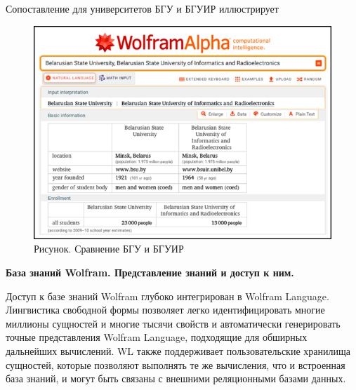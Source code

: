 Сопоставление для университетов БГУ и БГУИР иллюстрирует  \textit{}
\begin{figure}[H]
	\includegraphics[scale=0.86]{images/part7/chapter_integration/integr_alg3.png}
	\caption{Рисунок. Сравнение БГУ и БГУИР}
	\label{fig:integr_alg3}
\end{figure}

\textbf{База знаний Wolfram. Представление знаний и доступ к ним.}

Доступ к базе знаний Wolfram глубоко интегрирован в Wolfram Language. Лингвистика свободной формы позволяет легко идентифицировать многие миллионы сущностей и многие тысячи свойств и автоматически генерировать точные представления Wolfram Language, подходящие для обширных дальнейших вычислений. WL также поддерживает пользовательские хранилища сущностей, которые позволяют выполнять те же вычисления, что и встроенная база знаний, и могут быть связаны с внешними реляционными базами данных. 

